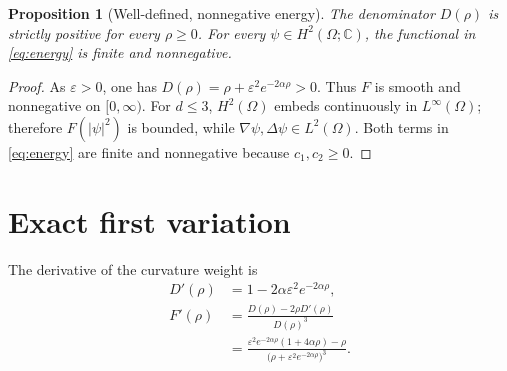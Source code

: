 \documentclass[11pt]{article}
\newtheorem{proposition}{Proposition}
\newcommand{\Om}{\Omega}
\newcommand{\CC}{\mathbb C}
\begin{document}
\begin{proposition}[Well-defined, nonnegative energy]\label{prop:positivity}
The denominator $D(\rho)$ is strictly positive for every $\rho\ge0$.
For every $\psi\in H^2(\Om;\CC)$, the functional in
\eqref{eq:energy} is finite and nonnegative.
\end{proposition}
\begin{proof}
As $\varepsilon>0$, one has
$D(\rho)=\rho+\varepsilon^2e^{-2\alpha\rho}>0$.
Thus $F$ is smooth and nonnegative on $[0,\infty)$.
For $d\le3$, $H^2(\Om)$ embeds continuously in $L^\infty(\Om)$;
therefore $F(|\psi|^2)$ is bounded, while
$\nabla\psi,\Delta\psi\in L^2(\Om)$.  Both terms in
\eqref{eq:energy} are finite and nonnegative because $c_1,c_2\ge0$.
\end{proof}

\section{Exact first variation}
The derivative of the curvature weight is
\begin{align}
 D'(\rho)&=1-2\alpha\varepsilon^2e^{-2\alpha\rho},\\
 F'(\rho)&=\frac{D(\rho)-2\rho D'(\rho)}{D(\rho)^3}\\
 &=\boxed{\frac{\varepsilon^2e^{-2\alpha\rho}(1+4\alpha\rho)-\rho}
                   {\bigl(\rho+\varepsilon^2e^{-2\alpha\rho}\bigr)^3}}.
 \label{eq:Fprime}
\end{align}
\end{document}
